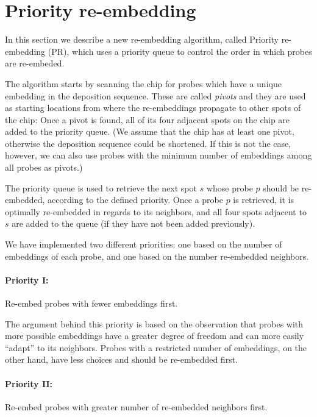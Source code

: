 \section{Priority re-embedding}
\label{sec:reembed_priority}

In this section we describe a new re-embedding algorithm, called Priority
re-embedding (PR), which uses a priority queue to control the order in which
probes are re-embeded.

The algorithm starts by scanning the chip for probes which have a unique
embedding in the deposition sequence. These are called \emph{pivots} and
they are used as starting locations from where the re-embeddings propagate to
other spots of the chip: Once a pivot is found, all of its four adjacent
spots on the chip are added to the priority queue. (We assume that the chip
has at least one pivot, otherwise the deposition sequence could be shortened. If
this is not the case, however, we can also use probes with the minimum number of
embeddings among all probes as pivots.)

The priority queue is used to retrieve the next spot $s$ whose probe $p$ should
be re-embedded, according to the defined priority. Once a probe $p$ is
retrieved, it is optimally re-embedded in regards to its neighbors, and all four
spots adjacent to $s$ are added to the queue (if they have not been added
previously).

We have implemented two different priorities: one based on the number of
embeddings of each probe, and one based on the number re-embedded neighbors.

\paragraph{Priority I:} Re-embed probes with fewer embeddings first.

The argument behind this priority is based on the observation that probes with
more possible embeddings have a greater degree of freedom and can more easily
``adapt'' to its neighbors. Probes with a restricted number of embeddings, on
the other hand, have less choices and should be re-embedded first.

\paragraph{Priority II:} Re-embed probes with greater number of re-embedded
neighbors first.

